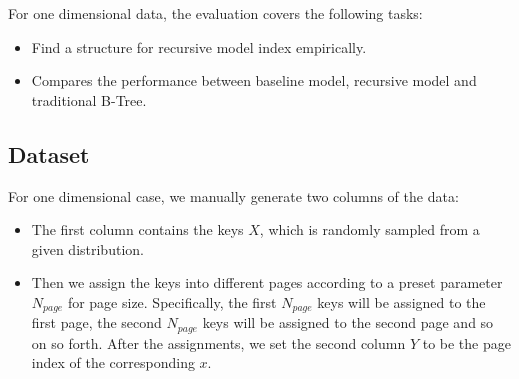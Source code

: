 For one dimensional data, the evaluation covers the following tasks:

\begin{itemize}
	\item Find a structure for recursive model index empirically.
	\item Compares the performance between baseline model, recursive model and traditional B-Tree.
\end{itemize}

\subsection{Dataset}

For one dimensional case, we manually generate two columns of the data:

\begin{itemize}
	\item The first column contains the keys $X$, which is randomly sampled from a given distribution.
	\item Then we assign the keys into different pages according to a preset parameter $N_{page}$ for page size. Specifically, the first $N_{page}$ keys will be assigned to the first page, the second $N_{page}$ keys will be assigned to the second page and so on so forth. After the assignments, we set the second column $Y$ to be the page index of the corresponding $x$.
\end{itemize}

